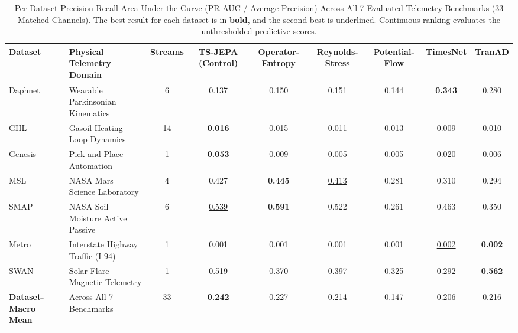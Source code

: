\begin{table}[t]
\centering
\caption{Per-Dataset Precision-Recall Area Under the Curve (PR-AUC / Average Precision) Across All 7 Evaluated Telemetry Benchmarks (33 Matched Channels). The best result for each dataset is in \textbf{bold}, and the second best is \underline{underlined}. Continuous ranking evaluates the unthresholded predictive scores.}
\label{tab:dataset_prauc}
\small
\scriptsize
\setlength{\tabcolsep}{2.5pt}
\begin{tabular}{@{}ll c cccc cc@{}}
\toprule
\textbf{Dataset} & \textbf{Physical Telemetry Domain} & \textbf{Streams} & \textbf{TS-JEPA (Control)} & \textbf{Operator-Entropy} & \textbf{Reynolds-Stress} & \textbf{Potential-Flow} & \textbf{TimesNet} & \textbf{TranAD} \\
\midrule
Daphnet  & Wearable Parkinsonian Kinematics & 6  & 0.137 & 0.150 & 0.151 & 0.144 & \textbf{0.343} & \underline{0.280} \\
GHL      & Gasoil Heating Loop Dynamics     & 14 & \textbf{0.016} & \underline{0.015} & 0.011 & 0.013 & 0.009 & 0.010 \\
Genesis  & Pick-and-Place Automation        & 1  & \textbf{0.053} & 0.009 & 0.005 & 0.005 & \underline{0.020} & 0.006 \\
MSL      & NASA Mars Science Laboratory     & 4  & 0.427 & \textbf{0.445} & \underline{0.413} & 0.281 & 0.310 & 0.294 \\
SMAP     & NASA Soil Moisture Active Passive & 6  & \underline{0.539} & \textbf{0.591} & 0.522 & 0.261 & 0.463 & 0.350 \\
Metro    & Interstate Highway Traffic (I-94) & 1  & 0.001 & 0.001 & 0.001 & 0.001 & \underline{0.002} & \textbf{0.002} \\
SWAN     & Solar Flare Magnetic Telemetry   & 1  & \underline{0.519} & 0.370 & 0.397 & 0.325 & 0.292 & \textbf{0.562} \\
\midrule
\textbf{Dataset-Macro Mean} & Across All 7 Benchmarks & 33 & \textbf{0.242} & \underline{0.227} & 0.214 & 0.147 & 0.206 & 0.216 \\
\bottomrule
\end{tabular}
\end{table}

